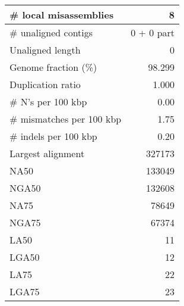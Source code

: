 \documentclass[12pt,a4paper]{article}
\begin{document}
\begin{table}[ht]
\begin{center}
\begin{tabular}{|l*{1}{|r}|}
\# local misassemblies & 8 \\ \hline
\# unaligned contigs & 0 + 0 part \\ \hline
Unaligned length & 0 \\ \hline
Genome fraction (\%) & 98.299 \\ \hline
Duplication ratio & 1.000 \\ \hline
\# N's per 100 kbp & 0.00 \\ \hline
\# mismatches per 100 kbp & 1.75 \\ \hline
\# indels per 100 kbp & 0.20 \\ \hline
Largest alignment & 327173 \\ \hline
NA50 & 133049 \\ \hline
NGA50 & 132608 \\ \hline
NA75 & 78649 \\ \hline
NGA75 & 67374 \\ \hline
LA50 & 11 \\ \hline
LGA50 & 12 \\ \hline
LA75 & 22 \\ \hline
LGA75 & 23 \\ \hline
\end{tabular}
\end{center}
\end{table}
\end{document}
